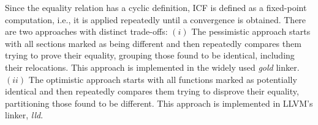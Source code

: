 

Since the equality relation has a cyclic definition, ICF is defined as a fixed-point computation, i.e., it is applied repeatedly until a convergence is obtained.
There are two approaches with distinct trade-offs:
$(i)$ The pessimistic approach starts with all sections marked as being different and then repeatedly compares them trying to prove their equality, grouping those found to be identical, including their relocations.
This approach is implemented in the widely used \textit{gold} linker.
$(ii)$ The optimistic approach starts with all functions marked as potentially identical and then repeatedly compares them trying to disprove their equality, partitioning those found to be different.
This approach is implemented in LLVM's linker, \textit{lld}.


